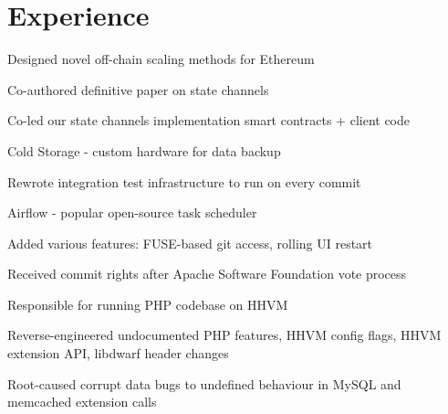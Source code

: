 \documentclass[]{deedy-resume-openfont}
\begin{document}
\begin{minipage}[t]{0.66\textwidth} 


\section{Experience}
\vspace{1em}
\begin{tightemize}
\item Designed novel off-chain scaling methods for Ethereum
\item Co-authored definitive paper on state channels
\item Co-led our state channels implementation smart contracts + client code
\end{tightemize}
\sectionsep

\begin{tightemize}
\item Cold Storage - custom hardware for data backup
\item Rewrote integration test infrastructure to run on every commit
\end{tightemize}
\sectionsep

\begin{tightemize}
\item Airflow - popular open-source task scheduler
\item Added various features: FUSE-based git access, rolling UI restart
\item Received commit rights after Apache Software Foundation vote process
\end{tightemize}
\sectionsep

\begin{tightemize}
\item Responsible for running PHP codebase on HHVM
\item Reverse-engineered undocumented PHP features, HHVM config flags, HHVM extension API, libdwarf header changes
\item Root-caused corrupt data bugs to undefined behaviour in MySQL and memcached extension calls
\end{tightemize}
\sectionsep


\end{minipage}
\end{document}
